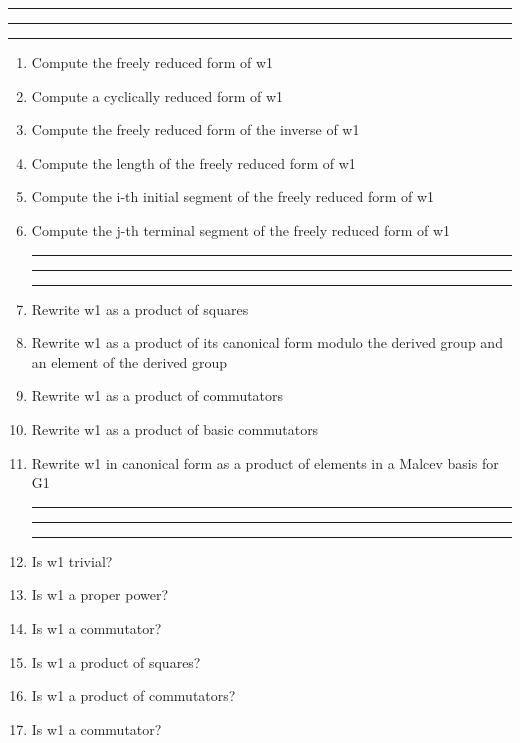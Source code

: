 
\bigskip
\hrule\hrule\hrule

\begin{enumerate}

\item Compute the freely reduced form of w1

\item Compute a cyclically reduced form of w1

\item Compute the freely reduced form of the inverse of w1

\item Compute the length of the freely reduced form of w1

\item Compute the i-th initial segment of the freely reduced form of w1

\item Compute the j-th terminal segment of the freely reduced form of w1

\bigskip
\hrule\hrule\hrule

\item Rewrite w1 as a product of squares

\item Rewrite w1 as a product of its canonical form modulo the derived group
and an element of the derived group

\item Rewrite w1 as a product of commutators

\item Rewrite w1 as a product of basic commutators

\item Rewrite w1 in canonical form as a product of elements in a
Malcev basis for  G1

\bigskip
\hrule\hrule\hrule

\item Is w1 trivial?

\item Is w1 a proper power?

\item Is w1 a commutator?

\item Is w1 a product of squares?

\item Is w1 a product of commutators?

\item Is w1 a commutator?


\end{enumerate}
